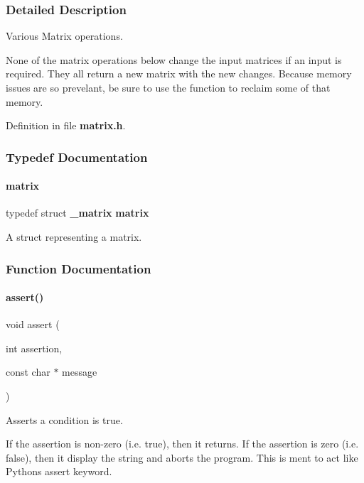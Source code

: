 \subsubsection{Detailed Description}
Various Matrix operations. 

None of the matrix operations below change the input matrices if an input is required. They all return a new matrix with the new changes. Because memory issues are so prevelant, be sure to use the  function to reclaim some of that memory. 

Definition in file \textbf{ matrix.\+h}.



\subsubsection{Typedef Documentation}
\mbox{\label{a00041_abc75382643898dd572498a574bf891c7}} 
\paragraph{matrix}
{\footnotesize\ttfamily typedef struct \textbf{ \+\_\+matrix}  \textbf{ matrix}}



A struct representing a matrix. 



\subsubsection{Function Documentation}
\mbox{\label{a00041_a8e41e30382335ea89f90b72db0b44d6f}} 
\paragraph{assert()}
{\footnotesize\ttfamily void assert (\begin{DoxyParamCaption}\item[{int}]{assertion,  }\item[{const char $\ast$}]{message }\end{DoxyParamCaption})}



Asserts a condition is true. 

If the assertion is non-\/zero (i.\+e. true), then it returns. If the assertion is zero (i.\+e. false), then it display the string and aborts the program. This is ment to act like Python\textquotesingle{}s assert keyword. 

